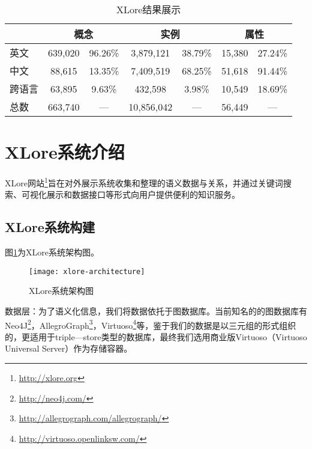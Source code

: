\begin{table}[htb]
  \centering
  \caption{XLore结果展示}
  \label{tab:xlore-result}
    \begin{tabular}{lcccccc}
      \toprule[1.5pt]
      \multicolumn{1}{c}{} & \multicolumn{2}{c}{概念}     & \multicolumn{2}{c}{实例}                   & \multicolumn{2}{c}{属性}    \\ \midrule[1pt]
英文            & 639,020 & 96.26\%          & 3,879,121   & 38.79\%                & 15,380  & 27.24\%                \\
中文            & 88,615  & 13.35\%          & 7,409,519   & 68.25\%                & 51,618  & 91.44\%                \\
跨语言          & 63,895  & 9.63\%           & 432,598     & 3.98\%                 & 10,549  & 18.69\%                \\
总数           & 663,740 & {—}               & 10,856,042  & {—}                    & 56,449  & {—} \\
      \bottomrule[1.5pt]
    \end{tabular}
\end{table}

\section{XLore系统介绍}
\label{sec5:system-describe}
XLore网站\footnote{\url{http://xlore.org}}旨在对外展示系统收集和整理的语义数据与关系，并通过关键词搜索、可视化展示和数据接口等形式向用户提供便利的知识服务。

\subsection{XLore系统构建}
图\ref{fig:xlore-architecture}为XLore系统架构图。

\begin{figure}[ht]
  \centering
  \texttt{[image: xlore-architecture]}
  \caption{XLore系统架构图}
  \label{fig:xlore-architecture}
\end{figure}

{\heiti 数据层：}为了语义化信息，我们将数据依托于图数据库。当前知名的的图数据库有Neo4J\footnote{\url{http://neo4j.com/}}，AllegroGraph\footnote{\url{http://allegrograph.com/allegrograph/}}，Virtuoso\footnote{\url{http://virtuoso.openlinksw.com/}}等，鉴于我们的数据是以三元组的形式组织的，更适用于triple—store类型的数据库，最终我们选用商业版Virtuoso（Virtuoso Universal Server）作为存储容器。

